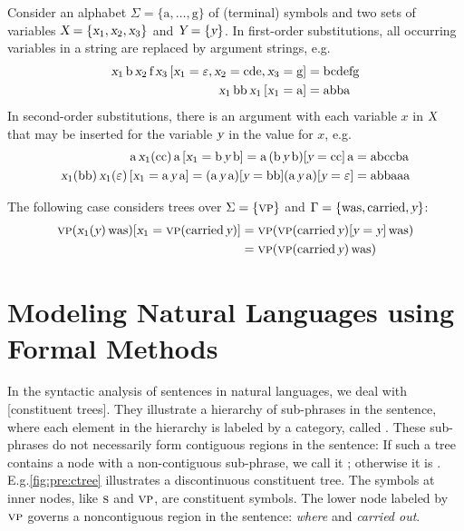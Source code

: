 \documentclass[../document.tex]{subfiles}
\begin{document}
    \begin{example}[Substitution]
        Consider an alphabet \(\Sigma = \{\text{a}, \ldots, \text{g}\}\) of (terminal) symbols and two sets of variables \(\textsl{X} = \{\textsl{x}_1, \textsl{x}_2, \textsl{x}_3\}\) and \(\textsl{Y} = \{\textsl{y}\}\).
        In first-order substitutions, all occurring variables in a string are replaced by argument strings, e.g.
        \begin{align*}
            \textsl{x}_1 \, \text{b} \, \textsl{x}_2 \, \text{f} \, \textsl{x}_3\,[\textsl{x}_1=\varepsilon, \textsl{x}_2=\text{cde}, \textsl{x}_3=\text{g}] &= \text{bcdefg} \\
            \textsl{x}_1 \, \text{bb} \, \textsl{x}_1 \, [\textsl{x}_1=\text{a}] &= \text{abba}
        \end{align*}
        In second-order substitutions, there is an argument with each variable \(x\) in \(\textsl{X}\) that may be inserted for the variable \(\textsl{y}\) in the value for \(x\), e.g.
        \begin{align*}
            \text{a} \, \textsl{x}_1(\text{cc}) \, \text{a} \, [\textsl{x}_1=\text{b}\,\textsl{y}\,\text{b}] = \text{a} \, (\text{b}\,\textsl{y}\,\text{b})[\textsl{y}=\text{cc}] \, \text{a} &= \text{abccba} \\
            \textsl{x}_1(\text{bb}) \, \textsl{x}_1(\varepsilon) \, [\textsl{x}_1=\text{a}\,\textsl{y}\,\text{a}] = (\text{a}\,\textsl{y}\,\text{a})[\textsl{y}=\text{bb}] (\text{a}\,\textsl{y}\,\text{a})[\textsl{y}=\varepsilon] &= \text{abbaaa}
        \end{align*}

        The following case considers trees over \(\Sigma=\{\textsc{vp}\}\) and \(\Gamma=\{\text{was}, \text{carried}, \textsl{y}\}\):
        \begin{align*}
            \textsc{vp}( \textsl{x}_1(\textsl{y}) \, \text{was} )[\textsl{x}_1=\textsc{vp}(\text{carried}\,\textsl{y})]
                &= \textsc{vp}( \textsc{vp}(\text{carried}\,\textsl{y})[\textsl{y}=\textsl{y}] \, \text{was} ) \\
                &= \textsc{vp}(\textsc{vp}(\text{carried}\,\textsl{y})\,\text{was})
        \end{align*}
    \end{example}

    \section{Modeling Natural Languages using Formal Methods}\label{sec:preliminaries:ctrees}
    In the syntactic analysis of sentences in natural languages, we deal with [constituent trees].
    They illustrate a hierarchy of sub-phrases in the sentence, where each element in the hierarchy is labeled by a category, called .
    These sub-phrases do not necessarily form contiguous regions in the sentence:
    If such a tree contains a node with a non-contiguous sub-phrase, we call it ; otherwise it is .
    E.g.\@ \cref{fig:pre:ctree} illustrates a discontinuous constituent tree.
    The symbols at inner nodes, like \(\textsc{s}\) and \(\textsc{vp}\), are constituent symbols.
    The lower node labeled by \(\textsc{vp}\) governs a noncontiguous region in the sentence: \emph{where} and \emph{carried out}.
\end{document}
